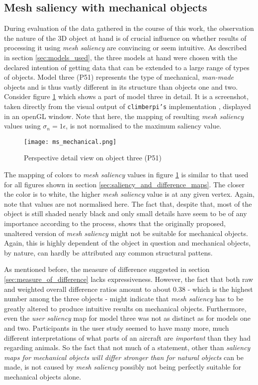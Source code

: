 		\subsection{Mesh saliency with mechanical objects}
		\label{sec:mesh_saliency_with_mechanical_objects}
During evaluation of the data gathered in the course of this work, the observation the nature of the 3D object at hand is of crucial influence on whether results of processing it using \textit{mesh saliency} are convincing or seem intuitive. As described in section \ref{sec:models_used}, the three models at hand were chosen with the declared intention of getting data that can be extended to a large range of types of objects. Model three (P51) represents the type of mechanical, \textit{man-made} objects and is thus vastly different in its structure than objects one and two. Consider figure \ref{fig:results_ms_mechanical} which shows a part of model three in detail. It is a screenshot, taken directly from the visual output of \texttt{climberpi's} implementation \cite{clms}, displayed in an openGL window. Note that here, the mapping of resulting \textit{mesh saliency} values using $\sigma_{n} = 1\epsilon$, is not normalised to the maximum saliency value.

\begin{figure}[!h]
	\centering
	\texttt{[image: ms\_mechanical.png]}\\ %
	\caption{Perspective detail view on object three (P51)}
	\label{fig:results_ms_mechanical}
\end{figure}

The mapping of colors to \textit{mesh saliency} values in figure \ref{fig:results_ms_mechanical} is similar to that used for all figures shown in section \ref{sec:saliency_and_difference_maps}. The closer the color is to white, the higher \textit{mesh saliency} value is at any given vertex. Again, note that values are not normalised here. The fact that, despite that, most of the object is still shaded nearly black and only small details have seem to be of any importance according to the process, shows that the originally proposed, unaltered version of \textit{mesh saliency} might not be suitable for mechanical objects. Again, this is highly dependent of the object in question and mechanical objects, by nature, can hardly be attributed any common structural pattens.

As mentioned before, the measure of difference suggested in section \ref{sec:measure_of_difference} lacks expressiveness. However, the fact that both raw and weighted overall difference ratios amount to about 0.38 - which is the highest number among the three objects - might indicate that \textit{mesh saliency} has to be greatly altered to produce intuitive results on mechanical objects. Furthermore, even the \textit{user saliency} map for model three was not as distinct as for models one and two. Participants in the user study seemed to have many more, much different interpretations of what parts of an aircraft are \textit{important} than they had regarding animals. So the fact that not much of a statement, other than \textit{saliency maps for mechanical objects will differ stronger than for natural objects} can be made, is not caused by \textit{mesh saliency} possibly not being perfectly suitable for mechanical objects alone.
